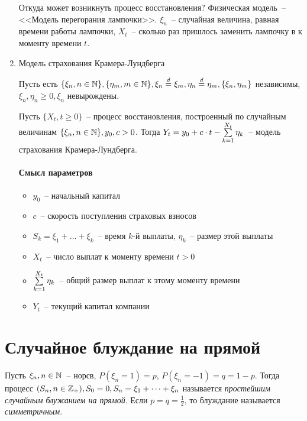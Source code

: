 \begin{enumerate}
Откуда может возникнуть процесс восстановления?
Физическая модель~-- <<Модель перегорания лампочки>>. $\xi_n$~-- случайная величина, равная времени работы лампочки, $X_t$~-- сколько раз пришлось заменить лампочку в к моменту времени $t$.

\item Модель страхования Крамера-Лундберга

Пусть есть $\{\xi_n, n \in \mathbb{N}\}, \{\eta_m, m \in \mathbb{N}\},
\xi_n \overset{d}{=} \xi_m,
\eta_n \overset{d}{=} \eta_m,
\{\xi_n, \eta_m\}$ независимы,
$\xi_n, \eta_n \geq 0, \xi_n$ невырождены.

Пусть $\{X_t, t \geq 0\}$~-- процесс восстановления, построенный по случайным величинам
$\{\xi_n, n \in \mathbb{N}\}, y_0, c > 0$. Тогда
$Y_t = y_0 + c \cdot t - \sum\limits_{k=1}^{X_t} \eta_k$~--
модель страхования Крамера-Лундберга.

\paragraph*{Смысл параметров}
\begin{itemize}
\item $y_0$~-- начальный капитал
\item $c$~-- скорость поступления страховых взносов
\item $S_k = \xi_1 + \dots + \xi_k$~-- время $k$-й выплаты, $\eta_k$~-- размер этой выплаты
\item $X_t$~-- число выплат к моменту времени $t > 0$
\item $\sum\limits_{k=1}^{X_t} \eta_k$~-- общий размер выплат к этому моменту времени
\item $Y_t$~-- текущий капитал компании
\end{itemize}
\end{enumerate}

\section{Случайное блуждание на прямой}

\begin{definition}
Пусть ${\xi_n, n\in \mathbb{N}}$~-- норсв, $P(\xi_n = 1) = p$, $P(\xi_n = -1) = q = 1-p$. Тогда процесс
$(S_n, n \in \mathbb{Z}_+), S_0 = 0, S_n = \xi_1 + \dots + \xi_n$ называется \emph{простейшим случайным блужанием на прямой}.
Если $p = q = \frac{1}{2}$, то блуждание называется \emph{симметричным}.
\end{definition}


